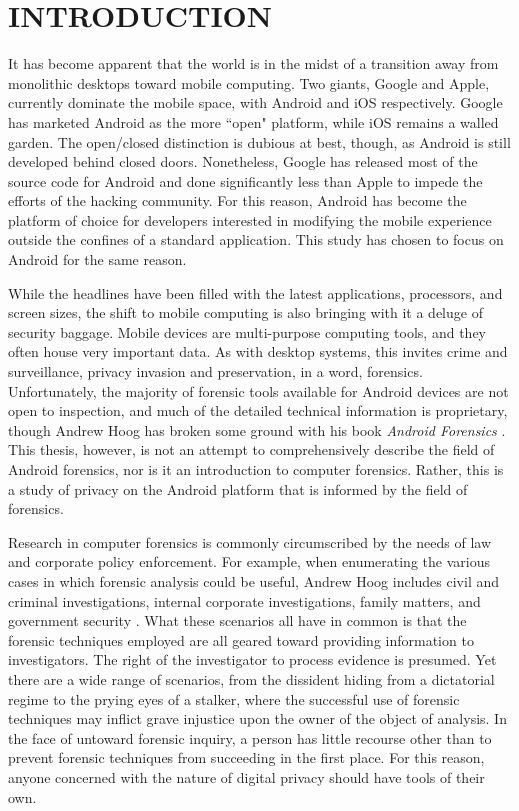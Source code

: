 \chapter{INTRODUCTION}
\label{ch:introduction}

It has become apparent that the world is in the midst of a transition away from monolithic desktops toward mobile computing.  Two
giants, Google and Apple, currently dominate the mobile space, with Android and iOS respectively.  Google has marketed Android as
the more ``open" platform, while iOS remains a walled garden.  The open/closed distinction is dubious at best, though, as Android is
still developed behind closed doors.  Nonetheless, Google has released most of the source code for Android and done significantly
less than Apple to impede the efforts of the hacking community. For this reason, Android has become the platform of choice for
developers interested in modifying the mobile experience outside the confines of a standard application.  This study has chosen
to focus on Android for the same reason.

While the headlines have been filled with the latest applications, processors, and screen sizes, the shift to mobile computing is
also bringing with it a deluge of security baggage. Mobile devices are multi-purpose computing tools, and they often house very
important data. As with desktop systems, this invites crime and surveillance, privacy invasion and preservation, in a word,
forensics.  Unfortunately, the majority of forensic tools available for Android devices are not open to inspection, and much of the
detailed technical information is proprietary, though Andrew Hoog has broken some ground with his book \emph{Android Forensics}
\citeyear{hoog}.  This thesis, however, is not an attempt to comprehensively describe the field of Android forensics, nor is it an
introduction to computer forensics. Rather, this is a study of privacy on the Android platform that is informed by the field of
forensics.

Research in computer forensics is commonly circumscribed by the needs of law and corporate policy enforcement.  For example, when
enumerating the various cases in which forensic analysis could be useful, Andrew Hoog includes civil and criminal investigations,
internal corporate investigations, family matters, and government security \cite{hoog}.  What these scenarios all have in common is
that the forensic techniques employed are all geared toward providing information to investigators.  The right of the investigator
to process evidence is presumed.  Yet there are a wide range of scenarios, from the dissident hiding from a dictatorial regime to
the prying eyes of a stalker, where the successful use of forensic techniques may inflict grave injustice upon the owner of the
object of analysis.  In the face of untoward forensic inquiry, a person has little recourse other than to prevent forensic
techniques from succeeding in the first place. For this reason, anyone concerned with the nature of digital privacy should have
tools of their own.  

